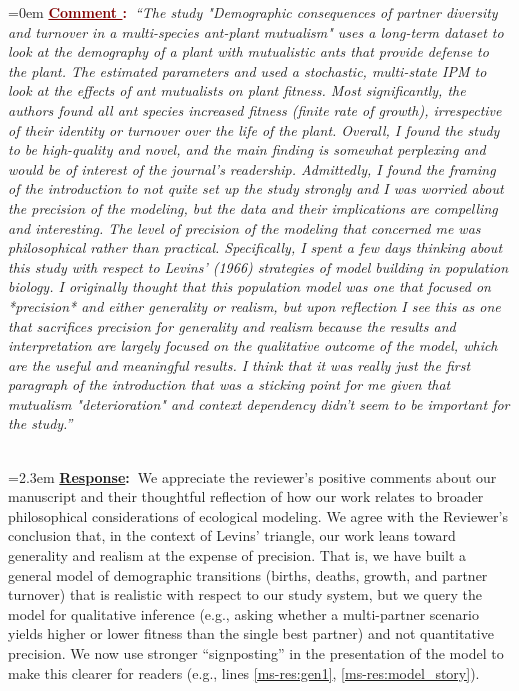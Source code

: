 \documentclass[12pt]{article}
\newcounter{cN}
\newcommand{\comment}[1]{
	\vspace{2em}
	\refstepcounter{cN} %
	\noindent \hangindent=0em \textbf{\textcolor{Maroon}{\uline{Comment \thecN}:~}}\emph{``#1''}
	}
\newcommand{\response}[1]{
	\\[0.25em]
	\hangindent=2.3em \textbf{\textcolor{NavyBlue}{\uline{Response}:~}}#1
	}
\begin{document}
\comment{The study "Demographic consequences of partner diversity and turnover in a multi-species ant-plant mutualism" uses a long-term dataset to look at the demography of a plant with mutualistic ants that provide defense to the plant. 
The estimated parameters and used a stochastic, multi-state IPM to look at the effects of ant mutualists on plant fitness. 
Most significantly, the authors found all ant species increased fitness (finite rate of growth), irrespective of their identity or turnover over the life of the plant. 
Overall, I found the study to be high-quality and novel, and the main finding is somewhat perplexing and would be of interest of the journal's readership. 
Admittedly, I found the framing of the introduction to not quite set up the study strongly and I was worried about the precision of the modeling, but the data and their implications are compelling and interesting. 
The level of precision of the modeling that concerned me was philosophical rather than practical. 
Specifically, I spent a few days thinking about this study with respect to Levins' (1966) strategies of model building in population biology. 
I originally thought that this population model was one that focused on *precision* and either generality or realism, but upon reflection I see this as one that sacrifices precision for generality and realism because the results and interpretation are largely focused on the qualitative outcome of the model, which are the useful and meaningful results. 
I think that it was really just the first paragraph of the introduction that was a sticking point for me given that mutualism "deterioration" and context dependency didn't seem to be important for the study.}
\response{We appreciate the reviewer's positive comments about our manuscript and their thoughtful reflection of how our work relates to broader philosophical considerations of ecological modeling. 
We agree with the Reviewer's conclusion that, in the context of Levins' triangle, our work leans toward generality and realism at the expense of precision. 
That is, we have built a general model of demographic transitions (births, deaths, growth, and partner turnover) that is realistic with respect to our study system, but we query the model for qualitative inference (e.g., asking whether a multi-partner scenario yields higher or lower fitness than the single best partner) and not quantitative precision. 
We now use stronger ``signposting'' in the presentation of the model to make this clearer for readers (e.g., lines \ref{ms-res:gen1}, \ref{ms-res:model_story}). 
}
\end{document}
